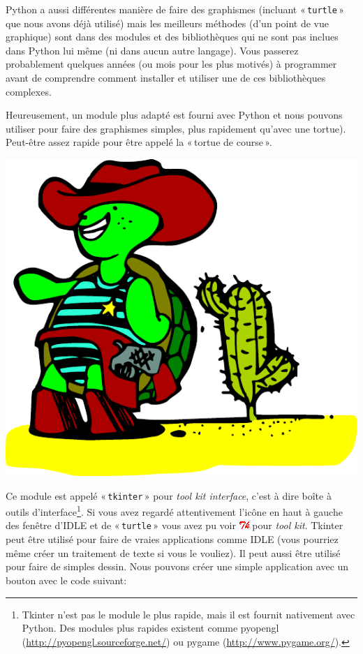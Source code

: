 Python a aussi différentes manière de faire des graphismes (incluant « \texttt{turtle} »  que nous avons déjà utilisé) mais les meilleurs méthodes (d'un point de vue graphique) sont dans des modules et des bibliothèques qui ne sont pas inclues dans Python lui même (ni dans aucun autre langage).
Vous passerez probablement quelques années (ou mois pour les plus motivés) à programmer avant de comprendre comment installer et utiliser une de ces bibliothèques complexes.

Heureusement, un module plus adapté est fourni avec Python et nous pouvons utiliser pour faire des graphismes simples, plus rapidement qu'avec une tortue). Peut-être assez rapide pour être appelé la « tortue de course ».
\begin{center}
\includegraphics[scale=1]{images/tortue_rapide}
\end{center}

Ce module est appelé « \texttt{tkinter} » pour \emph{tool kit interface}, c'est à dire boîte à outils d'interface\footnote{Tkinter n'est pas le module le plus rapide, mais il est fournit nativement avec Python. Des modules plus rapides existent comme pyopengl (\url{http://pyopengl.sourceforge.net/}) ou pygame (\url{http://www.pygame.org/}).}.
Si vous avez regardé  attentivement l'icône en haut à gauche des fenêtre d'IDLE et de « \texttt{turtle} » vous avez pu voir \includegraphics[scale=1]{images/tk} pour \emph{tool kit}. Tkinter peut être utilisé pour faire de vraies applications comme IDLE (vous pourriez même créer un traitement de texte si vous le vouliez). Il peut aussi être utilisé pour faire de simples dessin. Nous pouvons créer une simple application avec un bouton avec le code suivant:

